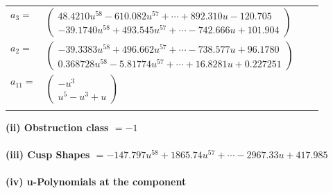 \documentclass[1p]{elsarticle_modified}
\theoremstyle{definition}
\begin{document}
\begin{tabular}{m{7pt} m{180pt} m{7pt} m{180pt} }
\flushright $a_{3}=$&$\begin{pmatrix}48.4210 u^{58}-610.082 u^{57}+\cdots+892.310 u-120.705\\-39.1740 u^{58}+493.545 u^{57}+\cdots-742.666 u+101.904\end{pmatrix}$ \\
\flushright $a_{2}=$&$\begin{pmatrix}-39.3383 u^{58}+496.662 u^{57}+\cdots-738.577 u+96.1780\\0.368728 u^{58}-5.81774 u^{57}+\cdots+16.8281 u+0.227251\end{pmatrix}$ \\
\flushright $a_{11}=$&$\begin{pmatrix}- u^3\\u^5- u^3+u\end{pmatrix}$\\&\end{tabular}
\flushleft \textbf{(ii) Obstruction class $= -1$}\\~\\
\flushleft \textbf{(iii) Cusp Shapes $= -147.797 u^{58}+1865.74 u^{57}+\cdots-2967.33 u+417.985$}\\~\\
\newpage\renewcommand{\arraystretch}{1}
\flushleft \textbf{(iv) u-Polynomials at the component}\newline \\
\end{document}
